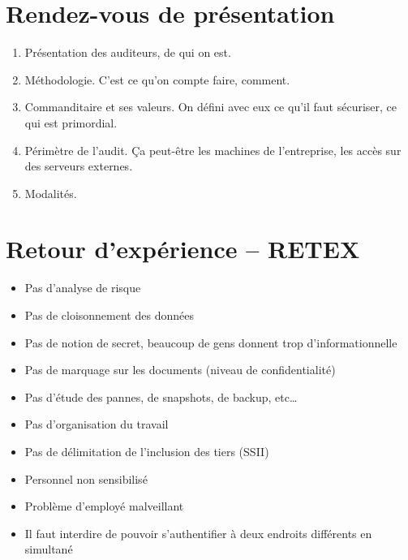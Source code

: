 \section{Rendez-vous de présentation}
\begin{enumerate}[I]
 \item Présentation des auditeurs, de qui on est.
 \item Méthodologie. C'est ce qu'on compte faire, comment.
 \item Commanditaire et ses valeurs. On défini avec eux ce qu'il faut sécuriser, ce qui est primordial.
 \item Périmètre de l'audit. Ça peut-être les machines de l'entreprise, les accès sur des serveurs externes.
 \item Modalités.
\end{enumerate}

\section{Retour d'expérience -- RETEX}
\begin{itemize}
 \item Pas d'analyse de risque
 \item Pas de cloisonnement des données
 \item Pas de notion de secret, beaucoup de gens donnent trop d'informationnelle
 \item Pas de marquage sur les documents (niveau de confidentialité)
 \item Pas d'étude des pannes, de snapshots, de backup, etc\ldots
 \item Pas d'organisation du travail
 \item Pas de délimitation de l'inclusion des tiers (SSII)
 \item Personnel non sensibilisé
 \item Problème d'employé malveillant
 \item Il faut interdire de pouvoir s'authentifier à deux endroits différents en simultané
\end{itemize}

